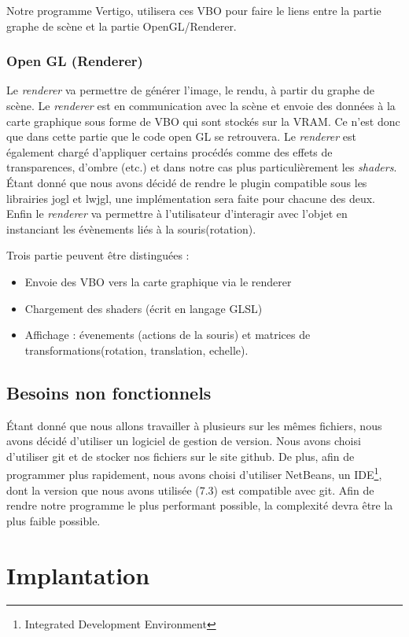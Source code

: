 \documentclass[11pt]{report}
\begin{document}
 Notre programme Vertigo, utilisera ces VBO pour faire le liens entre la partie graphe de scène et la partie OpenGL/Renderer.
 
 


\subsection{Open GL (Renderer)}

Le \textit{renderer} va permettre de générer l'image, le rendu, à partir du graphe de scène. Le \textit{renderer} est en communication avec la scène et envoie des données à la carte graphique sous forme de VBO qui sont stockés sur la VRAM. Ce n'est donc que dans cette partie que le code open GL se retrouvera.
Le \textit{renderer} est également chargé d'appliquer certains procédés comme des effets de transparences, d'ombre (etc.) et dans notre cas plus particulièrement les \textit{shaders}.
Étant donné que nous avons décidé de rendre le plugin compatible sous les librairies jogl et lwjgl, une implémentation sera faite pour chacune des deux.
Enfin le \textit{renderer} va permettre à l'utilisateur d'interagir avec l'objet en instanciant les évènements liés à la souris(rotation).

Trois partie peuvent être distinguées :
\begin{itemize}
\item Envoie des VBO vers la carte graphique via le renderer
\item Chargement des shaders (écrit en langage GLSL)
\item Affichage : évenements (actions de la souris) et matrices de transformations(rotation, translation, echelle).
\end{itemize}


\section{Besoins non fonctionnels}
Étant donné que nous allons travailler à plusieurs sur les mêmes fichiers, nous avons décidé d'utiliser un logiciel de gestion de version. Nous avons choisi d'utiliser git\cite{git} et de stocker nos fichiers sur le site github\cite{github}.
De plus, afin de programmer plus rapidement, nous avons choisi d'utiliser NetBeans\cite{netbeans}, un IDE\footnote{Integrated Development Environment}, dont la version que nous avons utilisée (7.3) est compatible avec git.
Afin de rendre notre programme le plus performant possible, la complexité devra être la plus faible possible. 
\chapter{Implantation} %
\end{document}
